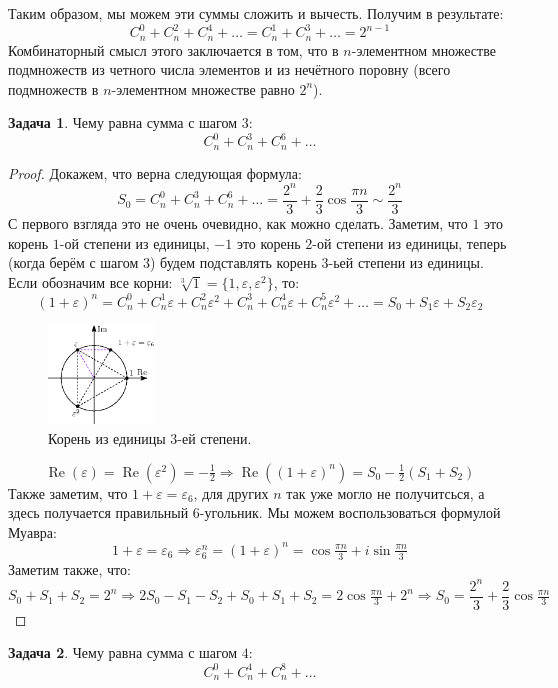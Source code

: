 \documentclass[12pt]{article}
\newcommand{\VE}{\varepsilon}
\theoremstyle{definition}
\newtheorem{problem}{Задача}
\DeclareMathOperator{\RE}{\operatorname{Re}}
\begin{document}
Таким образом, мы можем эти суммы сложить и вычесть. Получим в результате:
$$
	C_n^0 + C_n^2 + C_n^4 + \dotsc  = C_n^1 + C_n^3 + \dotsc = 2^{n-1}
$$
Комбинаторный смысл этого заключается в том, что в $n$-элементном множестве подмножеств из четного числа элементов и из нечётного поровну (всего подмножеств в $n$-элементном множестве равно $2^n$).

\begin{problem}
	Чему равна сумма с шагом $3$:
	$$
		C_n^0 + C_n^3 + C_n^6 + \dotsc
	$$
\end{problem}
\begin{proof}
	Докажем, что верна следующая формула:
	$$
		S_0 = C_n^0 + C_n^3 + C_n^6 + \dotsc = \dfrac{2^n}{3} + \dfrac{2}{3}\cos\dfrac{\pi n}{3} \sim \dfrac{2^n}{3}
	$$
	С первого взгляда это не очень очевидно, как можно сделать. Заметим, что $1$ это корень $1$-ой степени из единицы, $-1$ это корень $2$-ой степени из единицы, теперь (когда берём с шагом $3$) будем подставлять корень $3$-ьей степени из единицы. Если обозначим все корни: $\sqrt[3]{1} = \{1, \VE, \VE^2\}$, то:
	$$
		( 1 + \VE)^n = C_n^0 + C_n^1 \VE + C_n^2 \VE^2 + C_n^3 + C_n^4\VE + C_n^5 \VE^2 + \dotsc = S_0 + S_1\VE + S_2\VE_2
	$$
	\begin{figure}[H]
		\centering
		\includegraphics[width=0.25\textwidth]{AL1S3_8.eps}
		\caption{Корень из единицы $3$-ей степени.}
		\label{AL1S3_8}
	\end{figure}
	$$
		\RE(\VE) = \RE(\VE^2) = -\tfrac{1}{2} \Rightarrow \RE((1 + \VE)^n) = S_0 - \tfrac{1}{2}(S_1 + S_2)
	$$
	Также заметим, что $1 + \VE = \VE_6$, для других $n$ так уже могло не получитсься, а здесь получается правильный $6$-угольник. Мы можем воспользоваться формулой Муавра:
	$$
		1 + \VE = \VE_6 \Rightarrow \VE_6^n = (1 + \VE)^n =  \cos\tfrac{\pi n}{3} + i \sin\tfrac{\pi n}{3}
	$$
	Заметим также, что:
	$$
		S_0 + S_1 + S_2 = 2^n \Rightarrow  2S_0  - S_1 - S_2 + S_0 + S_1 + S_2 = 2\cos\tfrac{\pi n}{3} + 2^n \Rightarrow S_0 = \dfrac{2^n}{3} + \dfrac{2}{3}\cos\tfrac{\pi n}{3}  
	$$
\end{proof}
\begin{problem}
	Чему равна сумма с шагом $4$:
	$$
		C_n^0 + C_n^4 + C_n^8 + \dotsc
	$$
\end{problem}
\end{document}
